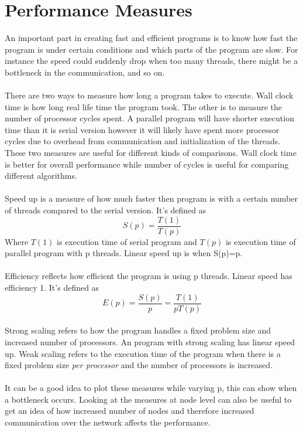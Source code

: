\documentclass[10pt,a4paper]{report}
\begin{document}
\section{Performance Measures}
An important part in creating fast and efficient programs is to know how fast the program is under certain conditions and which parts of the program are slow\cite{introduction_hpc_hager}. For instance the speed could suddenly drop when too many threads, there might be a bottleneck in the communication, and so on.\\
\\
There are two ways to measure how long a program takes to execute\cite{introduction_hpc_hager}. Wall clock time is how long real life time the program took. The other is to measure the number of processor cycles spent. A parallel program will have shorter execution time than it is serial version however it will likely have spent more processor cycles due to overhead from communication and initialization of the threads. These two measures are useful for different kinds of comparisons. Wall clock time is better for overall performance while number of cycles is useful for comparing different algorithms\cite{introduction_hpc_hager, cuda_best_practice}.\\
\\
Speed up is a measure of how much faster then program is with a certain number of threads compared to the serial version. It's defined as\cite{introduction_hpc_hager}
$$S(p)=\frac{T(1)}{T(p)}$$
Where $T(1)$ is execution time of serial program and $T(p)$ is execution time of parallel program with p threads. Linear speed up is when S(p)=p\cite{introduction_hpc_hager}.\\
\\
Efficiency reflects how efficient the program is using p threads. Linear speed has efficiency 1. It's defined as\cite{introduction_hpc_hager}
$$E(p)=\frac{S(p)}{p}=\frac{T(1)}{pT(p)}$$
\\
Strong scaling refers to how the program handles a fixed problem size and increased number of processors\cite{introduction_hpc_hager}. An program with strong scaling has linear speed up\cite{introduction_hpc_hager}. Weak scaling refers to the execution time of the program when there is a fixed problem size \emph{per processor} and the number of processors is increased\cite{introduction_hpc_hager, cuda_best_practice}.\\
\\
It can be a good idea to plot these measures while varying p, this can show when a bottleneck occurs. Looking at the measures at node level can also be useful to get an idea of how increased number of nodes and therefore increased communication over the network affects the performance.
\end{document}
